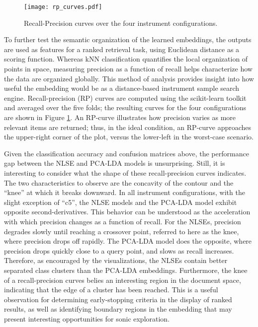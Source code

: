 \begin{figure}[h]
\centering
\texttt{[image: rp\_curves.pdf]}
\caption{Recall-Precision curves over the four instrument configurations.}
\label{fig:rp_curves}
\end{figure}

To further test the semantic organization of the learned embeddings, the outputs are used as features for a ranked retrieval task, using Euclidean distance as a scoring function.
Whereas kNN classification quantifies the local organization of points in space, measuring precision as a function of recall helps characterize how the data are organized globally.
This method of analysis provides insight into how useful the embedding would be as a distance-based instrument sample search engine.
Recall-precision (RP) curves are computed using the scikit-learn toolkit and averaged over the five folds; the resulting curves for the four configurations are shown in Figure \ref{fig:rp_curves}.
An RP-curve illustrates how precision varies as more relevant items are returned; thus, in the ideal condition, an RP-curve approaches the upper-right corner of the plot, versus the lower-left in the worst-case scenario.

Given the classification accuracy and confusion matrices above, the performance gap between the NLSE and PCA-LDA models is unsurprising.
Still, it is interesting to consider what the shape of these recall-precision curves indicates.
The two characteristics to observe are the concavity of the contour and the ``knee'' at which it breaks downward.
In all instrument configurations, with the slight exception of ``c5'', the NLSE models and the PCA-LDA model exhibit opposite second-derivatives.
This behavior can be understood as the acceleration with which precision changes as a function of recall.
For the NLSEs, precision degrades slowly until reaching a crossover point, referred to here as the knee, where precision drops off rapidly.
The PCA-LDA model does the opposite, where precision drops quickly close to a query point, and slows as recall increases.
Therefore, as encouraged by the visualizations, the NLSEs contain better separated class clusters than the PCA-LDA embeddings.
Furthermore, the knee of a recall-precision curves belies an interesting region in the document space, indicating that the edge of a cluster has been reached.
This is a useful observation for determining early-stopping criteria in the display of ranked results, as well as identifying boundary regions in the embedding that may present interesting opportunities for sonic exploration.

